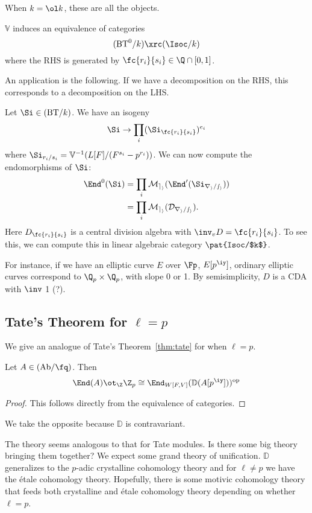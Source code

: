 When $k=\ol k$, these are all the objects.
\begin{thm}
$\mathbb V$ induces an equivalence of categories
\[
(\text{BT}^0/k)\xrc (\Isoc/k)%
\]
where the RHS is generated by $\fc{r_i}{s_i}\in \Q\cap [0,1]$.
\end{thm}

An application is the following. If we have a decomposition on the RHS, this corresponds to a decomposition on the LHS.

Let $\Si\in (\text{BT}/k)$. We have an isogeny
\[
\Si\to\prod_{i}(\Si_{\fc{r_i}{s_i}})^{e_i}
\]
where $\Si_{r_i/s_i} =\mathbb V^{-1} (L[F]/(F^{s_i}-p^{r_i}))$. 
We can now compute the endomorphisms of $\Si$:
\begin{align*}
\End^0(\Si)&=\prod_i \cal M_{e_i} (\End^0(\Si_{r_i/s_i}))\\
&=\prod_i \cal M_{e_i}(D_{r_i/s_i}).
\end{align*}
Here $D_{\fc{r_i}{s_i}}$ is a central division algebra with $\inv_vD =\fc{r_i}{s_i}$. To see this, we can compute this in linear algebraic category $\pat{Isoc/$k$}$.

\begin{ex}
For instance, if we have an elliptic curve $E$ over $\Fp$, $E[p^{\iy}]$, ordinary elliptic curves correspond to $\Q_p\times \Q_p$, with slope 0 or 1. By semisimplicity, $D$ is a CDA with $\inv$ 1 (?).
\end{ex}
\subsection{Tate's Theorem for $\ell=p$}
We give an analogue of Tate's Theorem~\ref{thm:tate} for when $\ell= p$.
\begin{thm}[Tate]
Let $A\in (\text{Ab}/\fq)$. Then
\[
\End(A)\ot_{\Z}\Z_p\cong \End_{W[F,V]}(\mathbb D(A[p^{\iy}]))^{\text{op}}
\]
\end{thm}
\begin{proof}
This follows directly from the equivalence of categories.
\end{proof}
We take the opposite because $\mathbb D$ is contravariant.

The theory seems analogous to that for Tate modules. Is there some big theory bringing them together? We expect some grand theory of unification. $\mathbb D$ generalizes to the $p$-adic crystalline cohomology theory and for $\ell\ne p$ we have the \'etale cohomology theory. Hopefully, there is some motivic cohomology theory that feeds both crystalline and \'etale cohomology theory depending on whether $\ell=p$.

